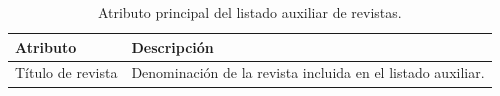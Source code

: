 \documentclass[11pt,spanish,listoffigures,listoftables]{tfgetsinf}
\begin{document}
\begin{table}[H]
\centering
\small
\renewcommand{\arraystretch}{1.25}
\begin{tabularx}{\textwidth}{
>{\raggedright\arraybackslash}p{4cm}
>{\raggedright\arraybackslash}X
}
\toprule
\textbf{Atributo} & \textbf{Descripción} \\
\midrule
Título de revista & Denominación de la revista incluida en el listado auxiliar. \\
\bottomrule
\end{tabularx}
\caption{Atributo principal del listado auxiliar de revistas.}
\label{tab:atributos_titulos_revistas}
\end{table}



%
%




\end{document}
